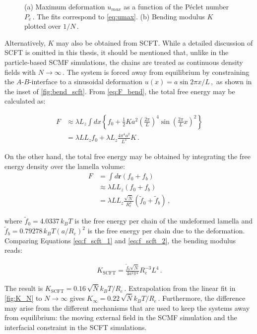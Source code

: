 \documentclass[bachelor,       %
               oneside,        %
               BCOR10mm,       %
               ngerman, english %
               ]{GAUBM}
\begin{document}
\begin{figure}[h]
\begin{subfigure}[b]{0.45\textwidth}
      \caption{}
      \label{fig:K_N}
  \end{subfigure}
     \caption{(a) Maximum deformation $u_{max}$ as a function of the P\'eclet number $P_e\,.$ The fits correspond to \autoref{eq:umax}. (b) Bending modulus $K$ plotted over $1/N\,.$}
\end{figure}


Alternatively, $K$ may also be obtained from \ac{SCFT}. While a detailed discussion of \ac{SCFT} is omitted in this thesis, it should be mentioned that, unlike in the particle-based \ac{SCMF} simulations, the chains are treated as continuous density fields with $N\rightarrow \infty\,.$ The system is forced away from equilibrium by constraining the $A$-$B$-interface to a sinusoidal deformation $u(x)=a\sin 2\pi x/L\,,$ as shown in the inset of \autoref{fig:bend_scft}. From \autoref{eq:F_bend}, the total free energy may be calculated as:

\begin{align}
    F&\approx\lambda L_z\int dx\left\{f_0+\frac{1}{2}Ka^2\left(\frac{2\pi}{L}\right)^4\sin\left(\frac{2\pi}{L}x\right)^2\right\}\nonumber\\
    &= \lambda LL_zf_0+\lambda L_z\frac{4\pi^4a^2}{L^3}K\,.
    \label{eq:f_scft_1}
\end{align}

On the other hand, the total free energy may be obtained by integrating the free energy density over the lamella volume:
\begin{align}
    F&=\int d\mathbf r(f_0+f_b)\nonumber\\
    &\approx \lambda LL_z(f_0+f_b)\nonumber \\
    &=\lambda LL_z\frac{\sqrt{\bar N}}{R_e^3}(\tilde f_0+\tilde f_b)\,,
    \label{eq:f_scft_2}
\end{align}

where $\tilde f_0=4.0337\,k_BT$ is the free energy per chain of the undeformed lamella and $\tilde f_b=0.79278\,k_BT(a/R_e)^2$ is the free energy per chain due to the deformation. Comparing Equations \eqref{eq:f_scft_1} and \eqref{eq:f_scft_2}, the bending modulus reads:

\begin{align}
    K_\text{SCFT}=\frac{\tilde f_b\sqrt{\bar N}}{4a^2\pi^4}R_e^{-3}L^4\,.
\end{align}

The result is $K_\text{SCFT}=0.16\,\sqrt{\bar N}k_BT/R_e\,.$ Extrapolation from the linear fit in \autoref{fig:K_N} to $N\rightarrow\infty$ gives $K_\infty=0.22\,\sqrt{\bar N}k_BT/R_e\,.$ Furthermore, the difference may arise from the different mechanisms that are used to keep the systems away from equilibrium: the moving external field in the \ac{SCMF} simulation and the interfacial constraint in the \ac{SCFT} simulations.
\end{document}
